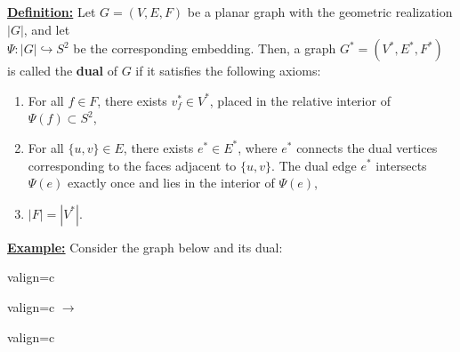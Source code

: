 \documentclass{article}
\begin{document}
\begin{graybox}
\noindent\underline{\textbf{Definition:}} Let $G = (V,E,F)$ be a planar graph with the geometric realization $|G|$, and let\\ $\Psi:|G| \hookrightarrow S^{2}$ be the corresponding embedding. Then, a graph $G^{*} = (V^{*}, E^{*}, F^{*})$ is called the \textbf{dual} of $G$ if it satisfies the following axioms:
\begin{enumerate}[label=(\roman*)]
    \item For all $f \in F$, there exists $v_f^* \in V^*$, placed in the relative interior of $\Psi(f) \subset S^2$,
    \item For all $\{u, v\} \in E$, there exists $e^* \in E^*$, where $e^*$ connects the dual vertices corresponding to the faces adjacent to $\{u, v\}$. The dual edge $e^*$ intersects $\Psi(e)$ exactly once and lies in the interior of $\Psi(e)$,
    \item $|F| = |V^*|$.
\end{enumerate}
\end{graybox}

\pagebreak

\noindent\underline{\textbf{Example:}} Consider the graph below and its dual:

\begin{center}
\begin{adjustbox}{valign=c}
\end{adjustbox}
\hspace{0.2cm}
\begin{adjustbox}{valign=c}
\({\longrightarrow}\)
\end{adjustbox}
\hspace{0.2cm}
\begin{adjustbox}{valign=c}
\end{adjustbox}
\end{center}
\end{document}
